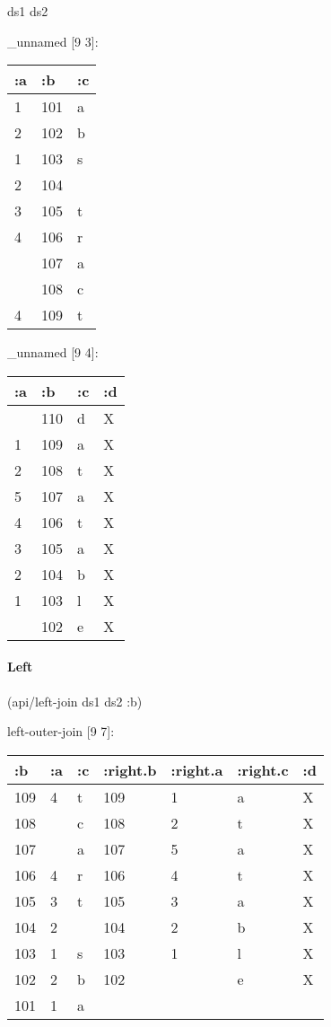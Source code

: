 \documentclass[]{article}
\newenvironment{Shaded}{\begin{snugshade}}{\end{snugshade}}
\newcommand{\AttributeTok}[1]{\textcolor[rgb]{0.77,0.63,0.00}{#1}}
\newcommand{\NormalTok}[1]{#1}
\let\oldparagraph\paragraph
\renewcommand{\paragraph}[1]{\oldparagraph{#1}\mbox{}}
\begin{document}
\begin{Shaded}
\begin{Highlighting}[]
\NormalTok{ds1}
\NormalTok{ds2}
\end{Highlighting}
\end{Shaded}

\_unnamed {[}9 3{]}:

\begin{longtable}[]{@{}lll@{}}
\toprule
:a & :b & :c\tabularnewline
\midrule
\endhead
1 & 101 & a\tabularnewline
2 & 102 & b\tabularnewline
1 & 103 & s\tabularnewline
2 & 104 &\tabularnewline
3 & 105 & t\tabularnewline
4 & 106 & r\tabularnewline
& 107 & a\tabularnewline
& 108 & c\tabularnewline
4 & 109 & t\tabularnewline
\bottomrule
\end{longtable}

\_unnamed {[}9 4{]}:

\begin{longtable}[]{@{}llll@{}}
\toprule
:a & :b & :c & :d\tabularnewline
\midrule
\endhead
& 110 & d & X\tabularnewline
1 & 109 & a & X\tabularnewline
2 & 108 & t & X\tabularnewline
5 & 107 & a & X\tabularnewline
4 & 106 & t & X\tabularnewline
3 & 105 & a & X\tabularnewline
2 & 104 & b & X\tabularnewline
1 & 103 & l & X\tabularnewline
& 102 & e & X\tabularnewline
\bottomrule
\end{longtable}

\hypertarget{left}{%
\paragraph{Left}\label{left}}

\begin{Shaded}
\begin{Highlighting}[]
\NormalTok{(api/left-join ds1 ds2 }\AttributeTok{:b}\NormalTok{)}
\end{Highlighting}
\end{Shaded}

left-outer-join {[}9 7{]}:

\begin{longtable}[]{@{}lllllll@{}}
\toprule
:b & :a & :c & :right.b & :right.a & :right.c & :d\tabularnewline
\midrule
\endhead
109 & 4 & t & 109 & 1 & a & X\tabularnewline
108 & & c & 108 & 2 & t & X\tabularnewline
107 & & a & 107 & 5 & a & X\tabularnewline
106 & 4 & r & 106 & 4 & t & X\tabularnewline
105 & 3 & t & 105 & 3 & a & X\tabularnewline
104 & 2 & & 104 & 2 & b & X\tabularnewline
103 & 1 & s & 103 & 1 & l & X\tabularnewline
102 & 2 & b & 102 & & e & X\tabularnewline
101 & 1 & a & & & &\tabularnewline
\bottomrule
\end{longtable}
\end{document}

